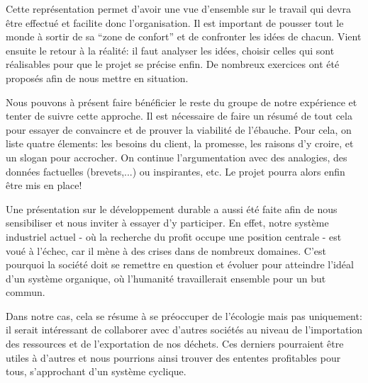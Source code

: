 Cette représentation permet d'avoir une vue d'ensemble sur le travail qui 
devra être effectué et facilite donc l'organisation. Il est important de pousser tout
le monde à sortir de sa ``zone de confort'' et de confronter les idées de chacun.
Vient ensuite le retour à la réalité: il faut analyser les idées, choisir celles qui 
sont réalisables pour que le projet se précise enfin. De nombreux exercices ont été 
proposés afin de nous mettre en situation. 

Nous pouvons à présent faire bénéficier le reste du groupe de notre expérience et tenter
de suivre cette approche. Il est nécessaire de faire un résumé de tout cela pour essayer 
de convaincre et de prouver la viabilité de l'ébauche. Pour cela, on liste 
quatre élements: les besoins du client, la promesse, les raisons d'y croire, 
et un slogan pour accrocher. On continue l'argumentation avec des analogies,
des données factuelles (brevets,...) ou inspirantes, etc. Le projet pourra alors
enfin être mis en place!

Une présentation sur le développement durable a aussi été faite afin de nous sensibiliser
et nous inviter à essayer d'y participer. 
En effet, notre système industriel actuel - où la recherche du profit occupe une position
centrale - est voué à l'échec, car il mène à des crises dans de nombreux domaines.
C'est pourquoi la société doit se remettre en question et évoluer pour atteindre
l'idéal d'un système organique, où l'humanité travaillerait ensemble pour un but commun. 

Dans notre cas, cela se résume à se préoccuper de l'écologie mais pas uniquement:
il serait intéressant de collaborer avec d'autres sociétés au niveau de l'importation
des ressources et de l'exportation de nos déchets. Ces derniers pourraient être utiles
à d'autres et nous pourrions ainsi trouver des ententes profitables pour tous,
s'approchant d'un système cyclique.

%

